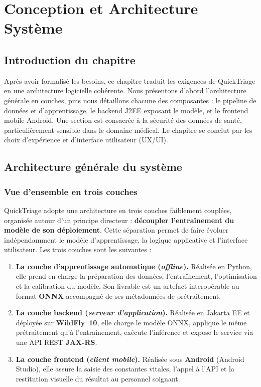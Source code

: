 \chapter{Conception et Architecture Système}

\section*{Introduction du chapitre}
Après avoir formalisé les besoins, ce chapitre traduit les exigences de QuickTriage en une
architecture logicielle cohérente. Nous présentons d'abord l'architecture générale en
couches, puis nous détaillons chacune des composantes : le pipeline de données et
d'apprentissage, le backend J2EE exposant le modèle, et le frontend mobile Android. Une
section est consacrée à la sécurité des données de santé, particulièrement sensible dans le
domaine médical. Le chapitre se conclut par les choix d'expérience et d'interface
utilisateur (UX/UI).

\section{Architecture générale du système}

\subsection{Vue d'ensemble en trois couches}
QuickTriage adopte une architecture en trois couches faiblement couplées, organisée autour
d'un principe directeur : \textbf{découpler l'entraînement du modèle de son déploiement}.
Cette séparation permet de faire évoluer indépendamment le modèle d'apprentissage, la logique
applicative et l'interface utilisateur. Les trois couches sont les suivantes :

\begin{enumerate}
  \item \textbf{La couche d'apprentissage automatique (\textit{offline}).} Réalisée en
  Python, elle prend en charge la préparation des données, l'entraînement, l'optimisation et
  la calibration du modèle. Son livrable est un artefact interopérable au format \textbf{ONNX}
  accompagné de ses métadonnées de prétraitement.
  \item \textbf{La couche backend (\textit{serveur d'application}).} Réalisée en Jakarta EE et
  déployée sur \textbf{WildFly~10}, elle charge le modèle ONNX, applique le même prétraitement
  qu'à l'entraînement, exécute l'inférence et expose le service via une API REST
  \textbf{JAX-RS}.
  \item \textbf{La couche frontend (\textit{client mobile}).} Réalisée sous \textbf{Android}
  (Android Studio), elle assure la saisie des constantes vitales, l'appel à l'API et la
  restitution visuelle du résultat au personnel soignant.
\end{enumerate}

